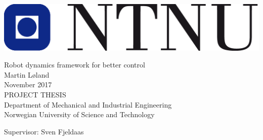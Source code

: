 
\thispagestyle{empty}
\includegraphics[scale=0.6]{img/ntnu}
\mbox{}\\[6pc]
\begin{center}
\Huge{Robot dynamics framework for better control}\\[2pc]

\Large{Martin Løland}\\[1pc]
\large{November 2017}\\[2pc]

PROJECT THESIS\\
Department of Mechanical and Industrial Engineering\\
Norwegian University of Science and Technology
\end{center}
\vfill

\noindent Supervisor: Sven Fjeldaas
